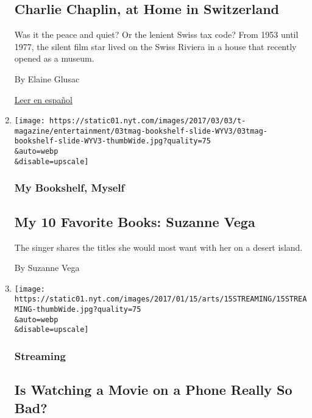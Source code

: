 \begin{enumerate}
{  \subsection{Charlie Chaplin, at Home in
  Switzerland}\label{charlie-chaplin-at-home-in-switzerland}}

  Was it the peace and quiet? Or the lenient Swiss tax code? From 1953
  until 1977, the silent film star lived on the Swiss Riviera in a house
  that recently opened as a museum.

  By Elaine Glusac

  \href{https://www.nytimes.com/es/2017/11/15/charlie-chaplin-casa-suiza-vevey/}{Leer
  en español}
\item
  \href{/2017/03/03/t-magazine/entertainment/suzanne-vega-favorite-books-list.html}{}

  \texttt{[image: https://static01.nyt.com/images/2017/03/03/t-magazine/entertainment/03tmag-bookshelf-slide-WYV3/03tmag-bookshelf-slide-WYV3-thumbWide.jpg?quality=75\\\&auto=webp\\\&disable=upscale]}

  \hypertarget{my-bookshelf-myself}{%
  \subsubsection{My Bookshelf, Myself}\label{my-bookshelf-myself}}

  \hypertarget{my-10-favorite-books-suzanne-vega}{%
  \subsection{My 10 Favorite Books: Suzanne
  Vega}\label{my-10-favorite-books-suzanne-vega}}

  The singer shares the titles she would most want with her on a desert
  island.

  By Suzanne Vega
\item
  \href{/2017/01/13/movies/is-watching-a-movie-on-a-phone-really-so-bad.html}{}

  \texttt{[image: https://static01.nyt.com/images/2017/01/15/arts/15STREAMING/15STREAMING-thumbWide.jpg?quality=75\\\&auto=webp\\\&disable=upscale]}

  \hypertarget{streaming}{%
  \subsubsection{Streaming}\label{streaming}}

  \hypertarget{is-watching-a-movie-on-a-phone-really-so-bad}{%
  \subsection{Is Watching a Movie on a Phone Really So
  Bad?}\label{is-watching-a-movie-on-a-phone-really-so-bad}}


\end{enumerate}
